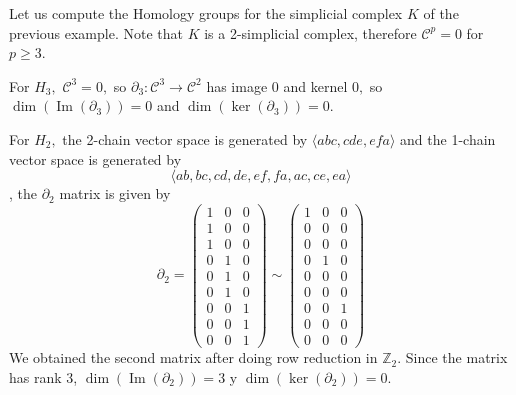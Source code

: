 \documentclass[
	fontsize=10pt, %
	twoside=false, %
	secnumdepth=1, %
]{kaobook}
\newcommand{\Z}{\mathbb{Z}}
\DeclareMathOperator{\im}{Im}
\begin{document}
\begin{example}
    Let us compute the Homology groups for the simplicial complex $K$ of the previous example. Note that $K$ is a 2-simplicial complex, therefore $\mathcal{C}^p=0$ for $p\geq 3.$

    For $H_3,$ $\mathcal{C}^3=0,$ so $\partial_3:\mathcal{C}^3\to\mathcal{C}^2$ has image $0$ and kernel $0,$ so $\dim(\im(\partial_3))=0$ and $\dim(\ker(\partial_3))=0.$
    
    For $H_2,$ the 2-chain vector space is generated by $\langle abc, cde, efa\rangle$ and the 1-chain vector space is generated by $$\langle ab, bc, cd, de, ef, fa, ac, ce, ea\rangle$$, the $\partial_2$ matrix is given by $$\partial_2=\left(\begin{array}{ccc} 1 & 0 & 0 \\ 1 & 0 & 0 \\ 1 & 0 & 0 \\ 0 & 1 & 0 \\ 0 & 1 & 0 \\ 0 & 1 & 0 \\ 0& 0 & 1 \\ 0 & 0 & 1 \\ 0 & 0 & 1\end{array}\right)\sim \left(\begin{array}{ccc} 1 & 0 & 0 \\ 0 & 0 & 0 \\ 0 & 0 & 0 \\ 0 & 1 & 0 \\ 0 & 0 & 0 \\ 0 & 0 & 0 \\ 0& 0 & 1 \\ 0 & 0 & 0 \\ 0 & 0 & 0\end{array}\right)$$
    We obtained the second matrix after doing row reduction in $\Z_2.$ Since the matrix has rank 3, $\dim(\im(\partial_2))=3$ y $\dim(\ker(\partial_2))=0.$


\end{example}
\end{document}

